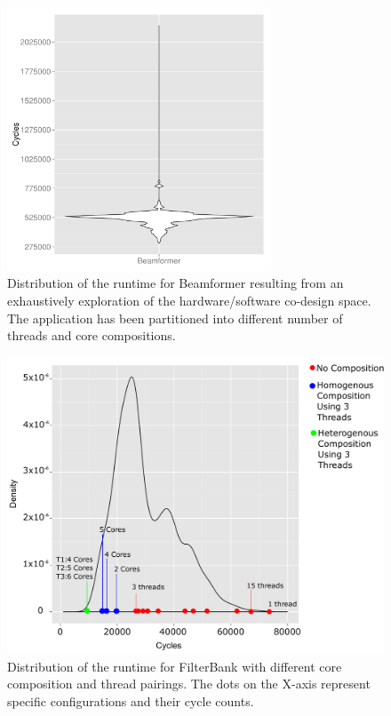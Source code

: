 \begin{figure}[h]
    \centering
    \includegraphics[width=0.7\textwidth]{streamit-paper/graphics/beamformer_motivation.pdf}
    \caption{Distribution of the runtime for Beamformer resulting from an exhaustively exploration of the hardware/software co-design space.
     The application has been partitioned into different number of threads and core compositions.}
     \label{fig:beamformermotiv}
\end{figure}

\begin{figure}[h]
    \centering
    \includegraphics[width=1\textwidth]{streamit-paper/graphics/temp_motivation_3.pdf}
    \caption{Distribution of the runtime for FilterBank with different core composition and thread pairings. The dots on the X-axis represent specific configurations and their cycle counts.}
     \label{fig:threadcoremotiv}
\end{figure}


